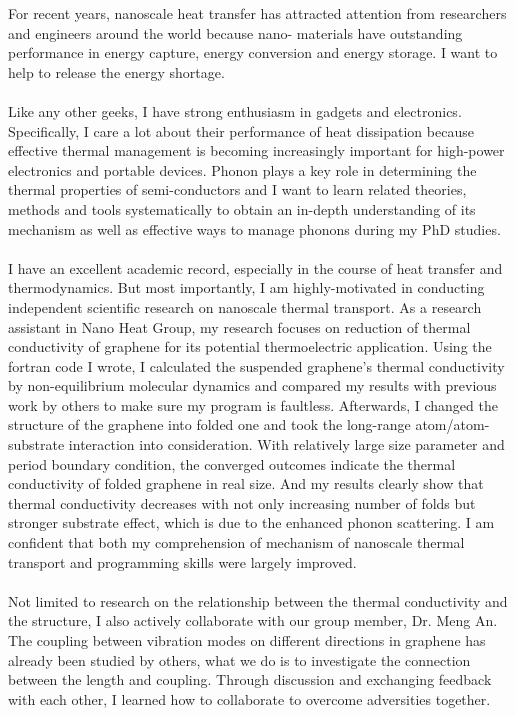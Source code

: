 \documentclass[a4paper,12pt]{article}
\begin{document}
\begin{spacing}{1.5}
\vspace{1.5em}
 For recent years, nanoscale heat transfer has attracted attention from researchers and engineers around the world because nano- materials have outstanding performance in energy capture, energy conversion and energy storage. I want to help to release the energy shortage.\\
\\
Like any other geeks, I have strong enthusiasm in gadgets and electronics. Specifically, I care a lot about their performance of heat dissipation because effective thermal management is becoming increasingly important for high-power electronics and portable devices. Phonon plays a key role in determining the thermal properties of semi-conductors and I want to learn related theories, methods and tools systematically to obtain an in-depth understanding of its mechanism as well as effective ways to manage phonons during my PhD studies.\\
\\
 I have an excellent academic record, especially in the course of heat transfer and thermodynamics. But most importantly, I am highly-motivated in conducting independent scientific research on nanoscale thermal transport. As a research assistant in Nano Heat Group, my research focuses on reduction of thermal conductivity of graphene for its potential thermoelectric application. Using the fortran code I wrote, I calculated the suspended graphene’s thermal conductivity by non-equilibrium molecular dynamics and compared my results with previous work by others to make sure my program is faultless. Afterwards, I changed the structure of the graphene into folded one and took the long-range atom/atom-substrate interaction into consideration. With relatively large size parameter and period boundary condition, the converged outcomes indicate the thermal conductivity of folded graphene in real size. And my results clearly show that thermal conductivity decreases with not only increasing number of folds but stronger substrate effect, which is due to the enhanced phonon scattering. I am confident that both my comprehension of mechanism of nanoscale thermal transport and programming skills were largely improved.\\
\\
 Not limited to research on the relationship between the thermal conductivity and the structure, I also actively collaborate with our group member, Dr. Meng An. The coupling between vibration modes on different directions in graphene has already been studied by others, what we do is to investigate the connection between the length and coupling. Through discussion and exchanging feedback with each other, I learned how to collaborate to overcome adversities together.\\

\end{spacing}
\end{document}

